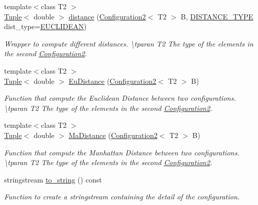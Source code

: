 \begin{DoxyCompactItemize}
{\footnotesize template$<$class T2 $>$ }\\\mbox{\hyperlink{class_tuple}{Tuple}}$<$ double $>$ \mbox{\hyperlink{class_configuration2_a5cf4a74b6fe52cd7d8c9ff8472ff2df9}{distance}} (\mbox{\hyperlink{class_configuration2}{Configuration2}}$<$ T2 $>$ B, \mbox{\hyperlink{maths_8hh_ac50d7263b1cae8691420b86282b27f90}{D\+I\+S\+T\+A\+N\+C\+E\+\_\+\+T\+Y\+PE}} dist\+\_\+type=\mbox{\hyperlink{maths_8hh_ac50d7263b1cae8691420b86282b27f90a81bbbc4428c3ff3f1327e94957e2b5f1}{E\+U\+C\+L\+I\+D\+E\+AN}})
\begin{DoxyCompactList}\small\item\em Wrapper to compute different distances. \textbackslash{}tparan T2 The type of the elements in the second {\ttfamily \mbox{\hyperlink{class_configuration2}{Configuration2}}}. \end{DoxyCompactList}\item 
{\footnotesize template$<$class T2 $>$ }\\\mbox{\hyperlink{class_tuple}{Tuple}}$<$ double $>$ \mbox{\hyperlink{class_configuration2_aae3e1b7e718b227b6fa65db67ab2b8eb}{Eu\+Distance}} (\mbox{\hyperlink{class_configuration2}{Configuration2}}$<$ T2 $>$ B)
\begin{DoxyCompactList}\small\item\em Function that compute the Euclidean Distance between two configurations. \textbackslash{}tparan T2 The type of the elements in the second {\ttfamily \mbox{\hyperlink{class_configuration2}{Configuration2}}}. \end{DoxyCompactList}\item 
{\footnotesize template$<$class T2 $>$ }\\\mbox{\hyperlink{class_tuple}{Tuple}}$<$ double $>$ \mbox{\hyperlink{class_configuration2_afb287896fc721e64bc50425795a84a77}{Ma\+Distance}} (\mbox{\hyperlink{class_configuration2}{Configuration2}}$<$ T2 $>$ B)
\begin{DoxyCompactList}\small\item\em Function that compute the Manhattan Distance between two configurations. \textbackslash{}tparan T2 The type of the elements in the second {\ttfamily \mbox{\hyperlink{class_configuration2}{Configuration2}}}. \end{DoxyCompactList}\item 
stringstream \mbox{\hyperlink{class_configuration2_ac68ba3be6be597763a5caa4bd7efa3d8}{to\+\_\+string}} () const
\begin{DoxyCompactList}\small\item\em Function to create a stringstream containing the detail of the configuration. \end{DoxyCompactList}\item 

\end{DoxyCompactItemize}
